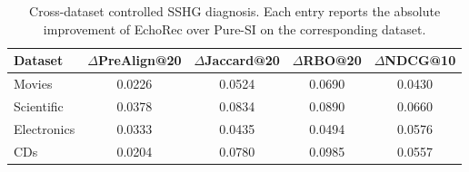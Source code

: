\begin{table}[t]
\centering
\caption{Cross-dataset controlled SSHG diagnosis. Each entry reports the absolute improvement of EchoRec over Pure-SI on the corresponding dataset.}
\label{tab:multidataset_sshg_delta}
\small
\setlength{\tabcolsep}{7pt}
\renewcommand{\arraystretch}{1.08}
\begin{tabular}{lcccc}
\toprule
Dataset & $\Delta$PreAlign@20 & $\Delta$Jaccard@20 & $\Delta$RBO@20 & $\Delta$NDCG@10 \\
\midrule
Movies & 0.0226 & 0.0524 & 0.0690 & 0.0430 \\
Scientific & 0.0378 & 0.0834 & 0.0890 & 0.0660 \\
Electronics & 0.0333 & 0.0435 & 0.0494 & 0.0576 \\
CDs & 0.0204 & 0.0780 & 0.0985 & 0.0557 \\
\bottomrule
\end{tabular}
\end{table}
